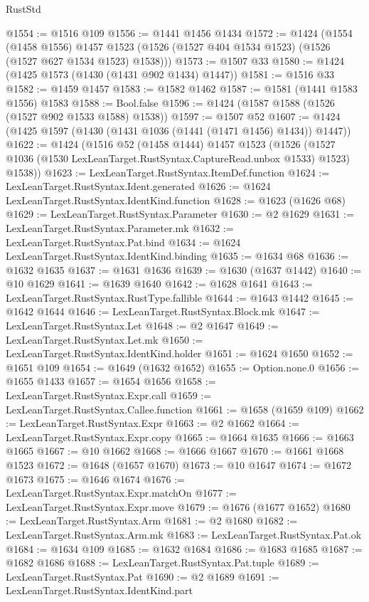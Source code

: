 \begin{lexlean}{RustStd}
\begin{coremodule}
{\begin{coremodule}
{{{{{{{{{{{{{{{{{{{{{{{{{{{{{{{{{{{{{{{{{{{{@1554 := @1516 @109
@1556 := @1441 @1456 @1434
@1572 := @1424
    (@1554
      (@1458 @1556)
      @1457
      @1523
      (@1526 (@1527 @404 @1534 @1523) (@1526 (@1527 @627 @1534 @1523) @1538)))
@1573 := @1507 @33
@1580 := @1424 (@1425 @1573 (@1430 (@1431 @902 @1434) @1447))
@1581 := @1516 @33
@1582 := @1459 @1457
@1583 := @1582 @1462
@1587 := @1581 (@1441 @1583 @1556) @1583
@1588 := Bool.false
@1596 := @1424 (@1587 @1588 (@1526 (@1527 @902 @1533 @1588) @1538))
@1597 := @1507 @52
@1607 := @1424 (@1425 @1597 (@1430 (@1431 @1036 (@1441 (@1471 @1456) @1434)) @1447))
@1622 := @1424
    (@1516
      @52
      (@1458 @1444)
      @1457
      @1523
      (@1526 (@1527 @1036 (@1530 LexLeanTarget.RustSyntax.CaptureRead.unbox @1533) @1523) @1538))
@1623 := LexLeanTarget.RustSyntax.ItemDef.function
@1624 := LexLeanTarget.RustSyntax.Ident.generated
@1626 := @1624 LexLeanTarget.RustSyntax.IdentKind.function
@1628 := @1623 (@1626 @68)
@1629 := LexLeanTarget.RustSyntax.Parameter
@1630 := @2 @1629
@1631 := LexLeanTarget.RustSyntax.Parameter.mk
@1632 := LexLeanTarget.RustSyntax.Pat.bind
@1634 := @1624 LexLeanTarget.RustSyntax.IdentKind.binding
@1635 := @1634 @68
@1636 := @1632 @1635
@1637 := @1631 @1636
@1639 := @1630 (@1637 @1442)
@1640 := @10 @1629
@1641 := @1639 @1640
@1642 := @1628 @1641
@1643 := LexLeanTarget.RustSyntax.RustType.fallible
@1644 := @1643 @1442
@1645 := @1642 @1644
@1646 := LexLeanTarget.RustSyntax.Block.mk
@1647 := LexLeanTarget.RustSyntax.Let
@1648 := @2 @1647
@1649 := LexLeanTarget.RustSyntax.Let.mk
@1650 := LexLeanTarget.RustSyntax.IdentKind.holder
@1651 := @1624 @1650
@1652 := @1651 @109
@1654 := @1649 (@1632 @1652)
@1655 := Option.none.{0}
@1656 := @1655 @1433
@1657 := @1654 @1656
@1658 := LexLeanTarget.RustSyntax.Expr.call
@1659 := LexLeanTarget.RustSyntax.Callee.function
@1661 := @1658 (@1659 @109)
@1662 := LexLeanTarget.RustSyntax.Expr
@1663 := @2 @1662
@1664 := LexLeanTarget.RustSyntax.Expr.copy
@1665 := @1664 @1635
@1666 := @1663 @1665
@1667 := @10 @1662
@1668 := @1666 @1667
@1670 := @1661 @1668 @1523
@1672 := @1648 (@1657 @1670)
@1673 := @10 @1647
@1674 := @1672 @1673
@1675 := @1646 @1674
@1676 := LexLeanTarget.RustSyntax.Expr.matchOn
@1677 := LexLeanTarget.RustSyntax.Expr.move
@1679 := @1676 (@1677 @1652)
@1680 := LexLeanTarget.RustSyntax.Arm
@1681 := @2 @1680
@1682 := LexLeanTarget.RustSyntax.Arm.mk
@1683 := LexLeanTarget.RustSyntax.Pat.ok
@1684 := @1634 @109
@1685 := @1632 @1684
@1686 := @1683 @1685
@1687 := @1682 @1686
@1688 := LexLeanTarget.RustSyntax.Pat.tuple
@1689 := LexLeanTarget.RustSyntax.Pat
@1690 := @2 @1689
@1691 := LexLeanTarget.RustSyntax.IdentKind.part
}}}}}}}}}}}}}}}}}}}}}}}}}}}}}}}}}}}}}}}}}}}}
\end{coremodule}}
\end{coremodule}
\end{lexlean}
